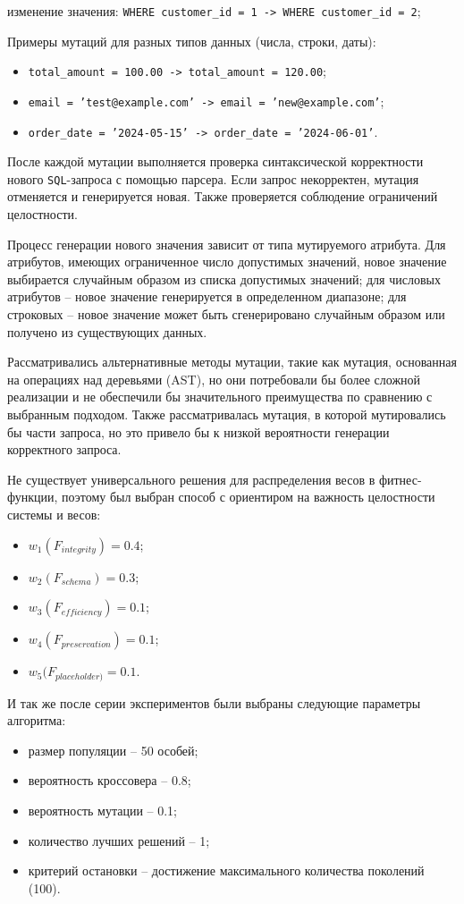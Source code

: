 \documentclass[master,paper]{pmk-graduate}
\begin{document}
изменение значения: \texttt{WHERE customer\_id = 1 -> WHERE customer\_id = 2};

Примеры мутаций для разных типов данных (числа, строки, даты):
\begin{itemize}
\item \texttt{total\_amount = 100.00 -> total\_amount = 120.00};
\item \texttt{email = 'test@example.com' -> email = 'new@example.com'};
\item \texttt{order\_date = '2024-05-15' -> order\_date = '2024-06-01'}.
\end{itemize}

После каждой мутации выполняется проверка синтаксической корректнос\-ти нового \texttt{SQL}-запроса с помощью парсера. Если запрос некорректен, мутация отменяется и генерируется новая. Также проверяется соблюдение ограничений целостности.

Процесс генерации нового значения зависит от типа мутируемого атрибута. Для атрибутов, имеющих ограниченное число допустимых значений, новое значение выбирается случайным образом из списка допустимых значений; для числовых атрибутов -- новое значение генерируется в определенном диапазоне; для строковых -- новое значение может быть сгенерировано случайным образом или получено из существующих данных.

Рассматривались альтернативные методы мутации, такие как мутация, основанная на операциях над деревьями (AST), но они потребовали бы более сложной реализации и не обеспечили бы значительного преимущества по сравнению с выбранным подходом. Также рассматривалась мутация, в которой мутировались бы части запроса, но это привело бы к низкой вероятности генерации корректного запроса.

Не существует универсального решения для распределения весов в фитнес-функции, поэтому был выбран способ с ориентиром на важность целостности системы и весов:
\begin{itemize}
\item $w_1 (F_{integrity})= 0.4$;
\item $w_2 (F_{schema})= 0.3$;
\item $w_3 (F_{efficiency})= 0.1$;
\item $w_4 (F_{preservation})= 0.1$;
\item $w_5 (F_{placeholder)}= 0.1$.
\end{itemize}

И так же после серии экспериментов были выбраны следующие параметры алгоритма:
\begin{itemize}
	\item размер популяции -- 50 особей;
	\item вероятность кроссовера -- 0.8;
	\item вероятность мутации -- 0.1;
	\item количество лучших решений -- 1;
	\item критерий остановки -- достижение максимального количества поколений (100).
\end{itemize}
\end{document}
